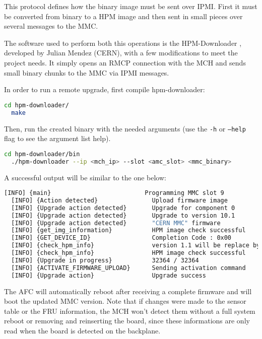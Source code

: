 \documentclass[letterpaper,12pt, titlepage]{article}
\begin{document}
This protocol defines how the binary image must be sent over IPMI. First it must be converted from binary to a HPM image and then sent in small pieces over several messages to the MMC.

The software used to perform both this operations is the HPM-Downloader \cite{hpm-github}, developed by Julian Mendez (CERN), with a few modifications to meet the project needs. It simply opens an RMCP connection with the MCH and sends small binary chunks to the MMC via IPMI messages.

In order to run a remote upgrade, first compile hpm-downloader:

\begin{lstlisting}[language=bash]
  cd hpm-downloader/
  make
\end{lstlisting}

Then, run the created binary with the needed arguments (use the \texttt{-h} or \texttt{--help} flag to see the argument list help).

\begin{lstlisting}[language=bash]
  cd hpm-downloader/bin
  ./hpm-downloader --ip <mch_ip> --slot <amc_slot> <mmc_binary>
\end{lstlisting}

A successful output will be similar to the one below:
\begin{lstlisting}[language=bash]
  [INFO] {main}                          Programming MMC slot 9
  [INFO] {Action detected}               Upload firmware image
  [INFO] {Upgrade action detected}       Upgrade for component 0
  [INFO] {Upgrade action detected}       Upgrade to version 10.1
  [INFO] {Upgrade action detected}       "CERN MMC" firmware
  [INFO] {get_img_information}           HPM image check successful
  [INFO] {GET_DEVICE_ID}                 Completion Code : 0x00
  [INFO] {check_hpm_info}                version 1.1 will be replace by 0.1
  [INFO] {check_hpm_info}                HPM image check successful
  [INFO] {Upgrade in progress}           32364 / 32364
  [INFO] {ACTIVATE_FIRMWARE_UPLOAD}      Sending activation command
  [INFO] {Upgrade action}                Upgrade success
\end{lstlisting}

The AFC will automatically reboot after receiving a complete firmware and will boot the updated MMC version. Note that if changes were made to the sensor table or the FRU information, the MCH won't detect them without a full system reboot or removing and reinserting the board, since these informations are only read when the board is detected on the backplane.
\end{document}
